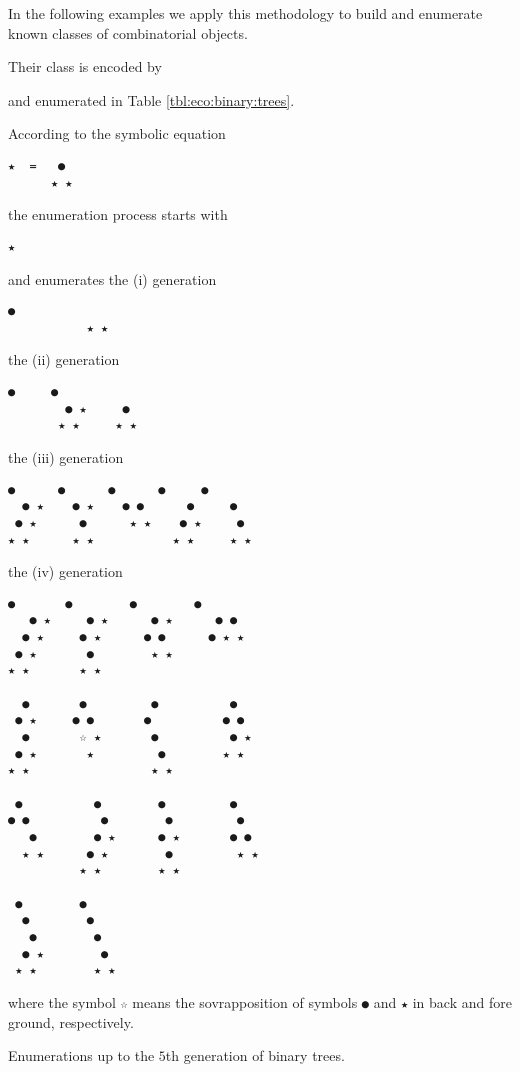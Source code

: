 In the following examples we apply this methodology to build and enumerate
known classes of combinatorial objects.

\newpage

\begin{example}
Their class is encoded by

and enumerated in Table \ref{tbl:eco:binary:trees}.

\begin{margintable}
According to the symbolic equation
\begin{Verbatim}[baselinestretch=0.5,fontsize=\footnotesize]
★  =   ●
      ★ ★
\end{Verbatim}
the enumeration process starts with
\begin{Verbatim}[baselinestretch=0.5,fontsize=\footnotesize]
            ★
\end{Verbatim}
and enumerates the (i) generation
\begin{Verbatim}[baselinestretch=0.5,fontsize=\footnotesize]
            ●
           ★ ★
\end{Verbatim}
the (ii) generation
\begin{Verbatim}[baselinestretch=0.5,fontsize=\footnotesize]
         ●     ●
        ● ★     ●
       ★ ★     ★ ★
\end{Verbatim}
the (iii) generation
\begin{Verbatim}[baselinestretch=0.5,fontsize=\footnotesize]
   ●      ●      ●      ●     ●
  ● ★    ● ★    ● ●      ●     ●
 ● ★      ●      ★ ★    ● ★     ●
★ ★      ★ ★           ★ ★     ★ ★
\end{Verbatim}
the (iv) generation
\begin{Verbatim}[baselinestretch=0.5,fontsize=\footnotesize]
    ●       ●        ●        ●
   ● ★     ● ★      ● ★      ● ●
  ● ★     ● ★      ● ●      ● ★ ★
 ● ★       ●        ★ ★
★ ★       ★ ★

  ●       ●         ●          ●
 ● ★     ● ●       ●          ● ●
  ●       ☆ ★       ●          ● ★
 ● ★       ★         ●        ★ ★
★ ★                 ★ ★

 ●          ●        ●         ●
● ●          ●        ●         ●
   ●        ● ★      ● ★       ● ●
  ★ ★      ● ★        ●         ★ ★
          ★ ★        ★ ★

 ●        ●
  ●        ●
   ●        ●
  ● ★        ●
 ★ ★        ★ ★
\end{Verbatim}
where the symbol \verb|☆| means the sovrapposition of symbols \verb|●| and
\verb|★| in back and fore ground, respectively.
\caption{Enumerations up to the $5$th generation of binary trees.}
\label{tbl:eco:binary:trees}
\end{margintable}
\end{example}

